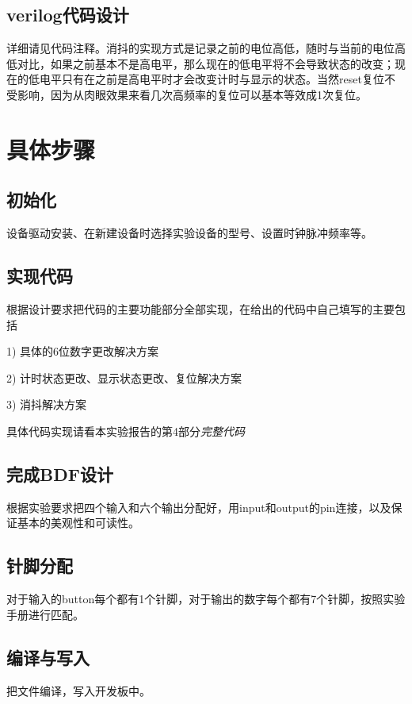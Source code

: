 \documentclass{article}
\begin{document}
        \subsection{verilog代码设计}
        	\par 详细请见代码注释。消抖的实现方式是记录之前的电位高低，随时与当前的电位高低对比，如果之前基本不是高电平，那么现在的低电平将不会导致状态的改变；现在的低电平只有在之前是高电平时才会改变计时与显示的状态。当然reset复位不受影响，因为从肉眼效果来看几次高频率的复位可以基本等效成1次复位。
        
    \section{具体步骤}
    
    	\subsection{初始化} 设备驱动安装、在新建设备时选择实验设备的型号、设置时钟脉冲频率等。
        
        \subsection{实现代码} 根据设计要求把代码的主要功能部分全部实现，在给出的代码中自己填写的主要包括
        \par 1) 具体的6位数字更改解决方案
        \par 2) 计时状态更改、显示状态更改、复位解决方案
        \par 3) 消抖解决方案
        \par 具体代码实现请看本实验报告的第4部分\emph{完整代码}
        
        \subsection{完成BDF设计} 根据实验要求把四个输入和六个输出分配好，用input和output的pin连接，以及保证基本的美观性和可读性。
        
        \subsection{针脚分配} 对于输入的button每个都有1个针脚，对于输出的数字每个都有7个针脚，按照实验手册进行匹配。
        \subsection{编译与写入} 把文件编译，写入开发板中。
    
\end{document}
